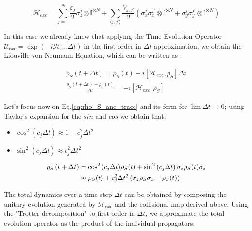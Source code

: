 \documentclass[a4paper,12pt]{article}
\begin{document}
	\begin{equation}
		\mathcal{H}_{exc} = \sum_{j=1}^{N} {\frac{\varepsilon_j}{2} \sigma_{z}^{j} \otimes \mathbb{I}^{\otimes N} } + \sum_{\langle j,j' \rangle} {\frac{V_{j,j'}}{2} \left( \sigma_{x}^{j}\sigma_{x}^{j'} \otimes \mathbb{I}^{\otimes N} + \sigma_{y}^{j}\sigma_{y}^{j'} \otimes \mathbb{I}^{\otimes N} \right)}
		\label{eq:H_exc}
	\end{equation}

	In this case we already know that applying the Time Evolution Operator $ \mathcal{U}_{exc} = \exp {\left( -i \mathcal{H}_{exc}\Delta t \right)} $ in the first order in $ \Delta t $ approximation, we obtain the Liouville-von Neumann Equation, which can be written as :

	\begin{align}
		\rho_S \left(t + \Delta t\right) = \rho_S (t) - i \left[\mathcal{H}_{exc}, \rho_S \right] \Delta t \\
		\frac{\rho_S \left(t + \Delta t\right) - \rho_S (t)}{\Delta t} = - i \left[\mathcal{H}_{exc}, \rho_S \right]
		\label{eq:Liouville_von_Neumann}
	\end{align}

	Let's focus now on Eq.\eqref{eq:rho_S_anc_trace} and its form for $ \lim \Delta t \rightarrow 0  $; using Taylor's expansion for the $ sin $ and $ cos $ we obtain that:

	\begin{itemize}
		\item $ \cos^{2}{\left(c_{j} \Delta t \right)} \approx 1 - c_{j}^{2} \Delta t ^{2} $
		\item $ \sin^{2}{\left(c_{j} \Delta t \right)} \approx c_{j}^{2} \Delta t ^{2} $
		\label{eq:sin_cos_approx}
	\end{itemize}
	\begin{align}
		\rho_S \left(t + \Delta t\right) & = \cos^{2}{\left(c_{j} \Delta t\right)} \rho_S (t) + \sin^{2}{\left(c_{j} \Delta t\right)} \, \sigma_{z} \rho_S (t) \sigma_{z} \notag \\
		& \approx \rho_S (t) + c_{j}^{2} \Delta t ^{2} \left( \sigma_{z} \rho_S \sigma_{z} - \rho_S (t) \right)
		\label{eq:rho_approx}
	\end{align}

	The total dynamics over a time step $\Delta t$ can be obtained by composing the unitary evolution generated by $\mathcal{H}_{exc}$ and the collisional map derived above. Using the "Trotter decomposition" to first order in $\Delta t$, we approximate the total evolution operator as the product of the individual propagators:
\end{document}
